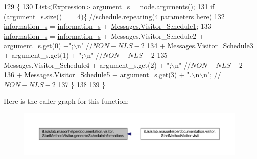 \begin{DoxyCode}
129                                                                      \{
130         List<Expression> argument\_s = node.arguments();
131         \textcolor{keywordflow}{if} (argument\_s.size() == 4)\{    \textcolor{comment}{//schedule.repeating(4 parameters here)}
132             \hyperlink{classit_1_1isislab_1_1masonhelperdocumentation_1_1visitor_1_1_start_method_visitor_a59b86134adb11f995ce96c1a96b51d50}{information\_s} = \hyperlink{classit_1_1isislab_1_1masonhelperdocumentation_1_1visitor_1_1_start_method_visitor_a59b86134adb11f995ce96c1a96b51d50}{information\_s} + 
      \hyperlink{classit_1_1isislab_1_1masonhelperdocumentation_1_1visitor_1_1_messages_a50822a1d6f5dd658aac1c947608b524b}{Messages.Visitor\_Schedule1};
133             \hyperlink{classit_1_1isislab_1_1masonhelperdocumentation_1_1visitor_1_1_start_method_visitor_a59b86134adb11f995ce96c1a96b51d50}{information\_s} = \hyperlink{classit_1_1isislab_1_1masonhelperdocumentation_1_1visitor_1_1_start_method_visitor_a59b86134adb11f995ce96c1a96b51d50}{information\_s} + Messages.Visitor\_Schedule2 + 
      argument\_s.get(0) +\textcolor{stringliteral}{";\(\backslash\)n"} \textcolor{comment}{//$NON-NLS-2$}
134                                 + Messages.Visitor\_Schedule3 + argument\_s.get(1) + \textcolor{stringliteral}{";\(\backslash\)n"} \textcolor{comment}{//$NON-NLS-2$}
135                                 + Messages.Visitor\_Schedule4 + argument\_s.get(2) + \textcolor{stringliteral}{";\(\backslash\)n"} \textcolor{comment}{//$NON-NLS-2$}
136                                 + Messages.Visitor\_Schedule5 + argument\_s.get(3) + \textcolor{stringliteral}{".\(\backslash\)n\(\backslash\)n"}; \textcolor{comment}{//$NON-NLS-2$}
137         \}
138         
139     \}
\end{DoxyCode}


Here is the caller graph for this function\-:
\nopagebreak
\begin{figure}[H]
\begin{center}
\leavevmode
\includegraphics[width=350pt]{classit_1_1isislab_1_1masonhelperdocumentation_1_1visitor_1_1_start_method_visitor_a0961ec6f09ea3a15c8d97240d4703eb2_icgraph}
\end{center}
\end{figure}


